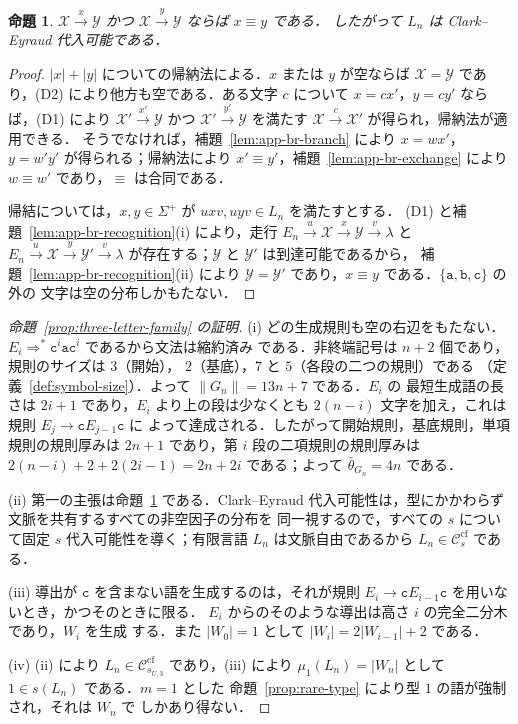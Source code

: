 \documentclass[11pt,a4paper]{ltjsarticle}
\numberwithin{equation}{section}
\theoremstyle{plain}
\newtheorem{proposition}[theorem]{命題}
\theoremstyle{definition}
\theoremstyle{remark}
\theoremstyle{plain}
\newcommand{\cf}{\mathrm{cf}}
\newcommand{\Ccf}[1]{\mathcal C_{#1}^{\cf}}
\newcommand{\eps}{\lambda}
\begin{document}
\begin{proposition}\label{prop:app-br-congruence}
\label{prop:app-tl-congruence}
$\mathcal X\xrightarrow{x}\mathcal Y$ かつ
$\mathcal X\xrightarrow{y}\mathcal Y$ ならば $x\equiv y$ である．
したがって $L_n$ は Clark--Eyraud 代入可能である．
\end{proposition}

\begin{proof}
$|x|+|y|$ についての帰納法による．$x$ または $y$ が空ならば
$\mathcal X=\mathcal Y$ であり，(D2) により他方も空である．ある文字 $c$
について $x=cx'$，$y=cy'$ ならば，(D1) により
$\mathcal X'\xrightarrow{x'}\mathcal Y$ かつ
$\mathcal X'\xrightarrow{y'}\mathcal Y$ を満たす
$\mathcal X\xrightarrow{c}\mathcal X'$ が得られ，帰納法が適用できる．
そうでなければ，補題~\ref{lem:app-br-branch} により $x=wx'$，$y=w'y'$
が得られる；帰納法により $x'\equiv y'$，補題~\ref{lem:app-br-exchange}
により $w\equiv w'$ であり，$\equiv$ は合同である．

帰結については，$x,y\in\Sigma^+$ が $uxv,uyv\in L_n$ を満たすとする．
(D1) と補題~\ref{lem:app-br-recognition}(i) により，走行
$E_n\xrightarrow{u}\mathcal X\xrightarrow{x}\mathcal Y\xrightarrow{v}\eps$ と
$E_n\xrightarrow{u}\mathcal X\xrightarrow{y}\mathcal Y'\xrightarrow{v}\eps$
が存在する；$\mathcal Y$ と $\mathcal Y'$ は到達可能であるから，
補題~\ref{lem:app-br-recognition}(ii) により $\mathcal Y=\mathcal Y'$
であり，$x\equiv y$ である．$\{\mathtt a,\mathtt b,\mathtt c\}$ の外の
文字は空の分布しかもたない．
\end{proof}

\begin{proof}[命題~\ref{prop:three-letter-family} の証明]
(i) どの生成規則も空の右辺をもたない．
$E_i\Rightarrow^*\mathtt c^i\mathtt a\mathtt c^i$ であるから文法は縮約済み
である．非終端記号は $n+2$ 個であり，規則のサイズは $3$（開始），
$2$（基底），$7$ と $5$（各段の二つの規則）である
（定義~\ref{def:symbol-size}）．よって $\|G_n\|=13n+7$ である．$E_i$ の
最短生成語の長さは $2i+1$ であり，$E_i$ より上の段は少なくとも
$2(n-i)$ 文字を加え，これは規則 $E_j\to\mathtt cE_{j-1}\mathtt c$ に
よって達成される．したがって開始規則，基底規則，単項規則の規則厚みは
$2n+1$ であり，第 $i$ 段の二項規則の規則厚みは
$2(n-i)+2+2(2i-1)=2n+2i$ である；よって $\bar\theta_{G_n}=4n$ である．

(ii) 第一の主張は命題~\ref{prop:app-br-congruence} である．Clark--Eyraud
代入可能性は，型にかかわらず文脈を共有するすべての非空因子の分布を
同一視するので，すべての $s$ について固定 $s$ 代入可能性を導く；有限言語
$L_n$ は文脈自由であるから $L_n\in\Ccf{s}$ である．

(iii) 導出が $\mathtt c$ を含まない語を生成するのは，それが規則
$E_i\to\mathtt cE_{i-1}\mathtt c$ を用いないとき，かつそのときに限る．
$E_i$ からのそのような導出は高さ $i$ の完全二分木であり，$W_i$ を生成
する．また $|W_0|=1$ として $|W_i|=2|W_{i-1}|+2$ である．

(iv) (ii) により $L_n\in\Ccf{s_{U,3}}$ であり，(iii) により
$\mu_1(L_n)=|W_n|$ として $1\in s(L_n)$ である．$m=1$ とした
命題~\ref{prop:rare-type} により型 $1$ の語が強制され，それは $W_n$ で
しかあり得ない．
\end{proof}
\end{document}
